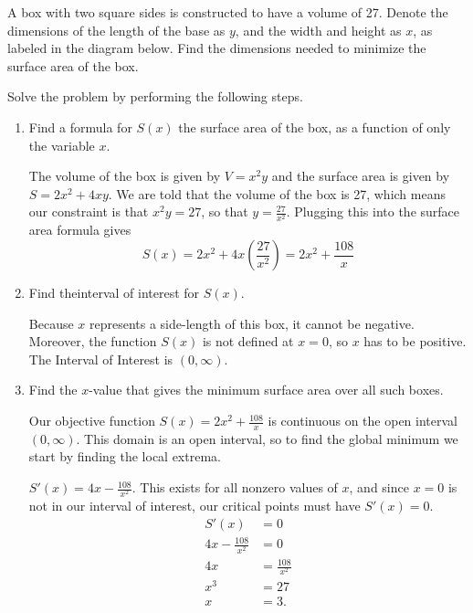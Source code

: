 \documentclass{ximera}
\begin{document}
\begin{problem}
A box with two square sides is constructed to have a volume of 27. Denote the dimensions of the length of the base as $y$, and the width and height as $x$, as labeled in the diagram below. Find the dimensions needed to minimize the surface area of the box.
		\begin{center}
		\end{center}
		Solve the problem by performing the following steps.

		
		\begin{enumerate}
			\item Find a formula for $S(x)$ the surface area of the box, as a function of only the variable $x$.
 
 	\begin{explanation}
        				The volume of the box is given by $V=x^2 y$ and the surface area is given by $S = 2x^2 + 4xy$. We are told that the volume of the box is 27, which means our constraint is that $x^2y = 27$, so that $y = \frac{27}{x^2}$. Plugging this into the surface area formula gives 
        				\[ S(x) = 2x^2 + 4x\left( \frac{27}{x^2} \right) = 2x^2 + \frac{108}{x} \]
			      \end{explanation}
			\item Find the{interval of interest} for $S(x)$. 
\begin{explanation}
        				Because $x$ represents a side-length of this box, it cannot be negative. Moreover, the function $S(x)$ is not defined at $x=0$,
        				so $x$ has to be positive. The Interval of Interest is $(0,\infty)$.
			      \end{explanation}
			      
			\item Find the $x$-value that gives the minimum surface area over all 
				such boxes.
				\begin{explanation}
        				Our objective function $S(x) = 2x^2 + \frac{108}{x}$ is continuous on the open interval $(0,\infty)$. This domain is an 
        				open interval, so to find the global minimum we start by finding the local extrema.
        				
        				$S'(x) = 4x - \frac{108}{x^2}$. This exists for all nonzero values of $x$, and since $x=0$ is not in our interval of interest,
        				our critical points must have $S'(x)=0$.
        				\begin{align*}
        					S'(x) &= 0\\
        					4x - \frac{108}{x^2} &= 0\\
						4x &= \frac{108}{x^2}\\
						x^3 &= 27\\
						x &= 3.
        				\end{align*} 
        				

\end{explanation}
\end{enumerate}
\end{problem}
\end{document}
